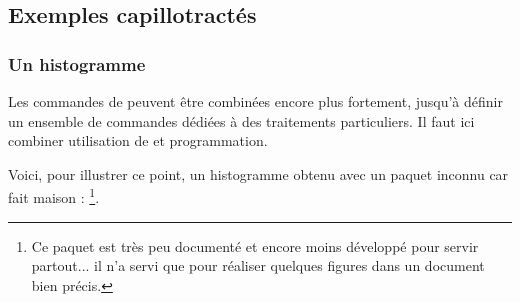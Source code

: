 

\subsection{Exemples capillotractés} 

\subsubsection{Un histogramme}

Les  commandes de  peuvent être combinées encore plus fortement, jusqu'à définir un ensemble de  commandes dédiées à des traitements particuliers. Il faut ici combiner utilisation de  et programmation.

Voici, pour illustrer ce point, un histogramme obtenu avec un paquet inconnu car fait maison : \footnote{Ce paquet est très peu documenté et encore moins développé pour servir partout... il n'a servi que pour réaliser quelques figures dans un document bien précis.}.


